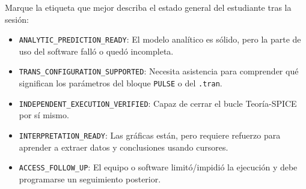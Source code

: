 \documentclass[11pt, a4paper]{article}
\begin{document}
\vspace{0.6cm}
\begin{tcolorbox}[colback=gray!5, colframe=gray!50, title=\textbf{Clasificación Formativa de Estado Operativo (Sin Valor Sumativo)}]
Marque la etiqueta que mejor describa el estado general del estudiante tras la sesión:
\begin{itemize}\setlength\itemsep{0.2em}
    \item[$\square$] \texttt{ANALYTIC\_PREDICTION\_READY}: El modelo analítico es sólido, pero la parte de uso del software falló o quedó incompleta.
    \item[$\square$] \texttt{TRANS\_CONFIGURATION\_SUPPORTED}: Necesita asistencia para comprender qué significan los parámetros del bloque \texttt{PULSE} o del \texttt{.tran}.
    \item[$\square$] \texttt{INDEPENDENT\_EXECUTION\_VERIFIED}: Capaz de cerrar el bucle Teoría-SPICE por sí mismo.
    \item[$\square$] \texttt{INTERPRETATION\_READY}: Las gráficas están, pero requiere refuerzo para aprender a extraer datos y conclusiones usando cursores.
    \item[$\square$] \texttt{ACCESS\_FOLLOW\_UP}: El equipo o software limitó/impidió la ejecución y debe programarse un seguimiento posterior.
\end{itemize}
\end{tcolorbox}
\end{document}
